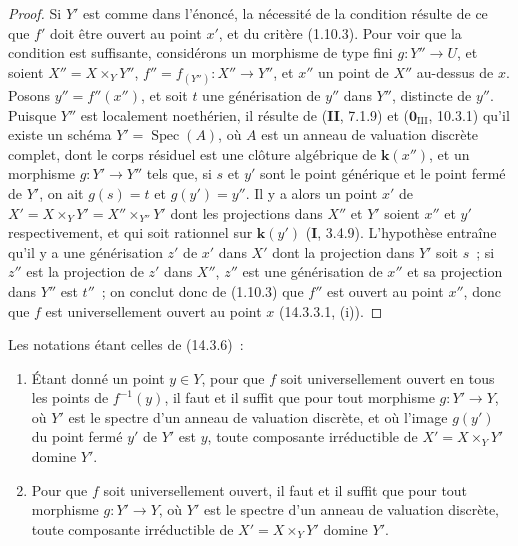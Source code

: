 \begin{proof}
Si $Y'$ est comme dans l'énoncé, la nécessité de la condition résulte de ce que
$f'$ doit être ouvert au point $x'$, et du critère (1.10.3). Pour voir que la
condition est suffisante, considérons un morphisme de type fini $g:Y''\to U$, et
soient $X''=X\times_Y Y''$, $f''=f_{(Y'')}:X''\to Y''$, et $x''$ un point de $X''$
au-dessus de $x$. Posons $y''=f''(x'')$, et soit $t$ une générisation de $y''$
dans $Y''$, distincte de $y''$. Puisque $Y''$ est localement noethérien, il
résulte de (\textbf{II}, 7.1.9) et ($\mathbf{0}_{\mathrm{III}}$, 10.3.1) qu'il
existe un schéma $Y'=\operatorname{Spec}(A)$, où $A$ est un anneau de valuation
discrète complet, dont le corps résiduel est une clôture algébrique de $\boldsymbol{k}(x'')$,
et un morphisme $g:Y'\to Y''$ tels que, si $s$ et $y'$ sont le point générique et
le point fermé de $Y'$, on ait $g(s)=t$ et $g(y')=y''$. Il y a alors un point $x'$
de $X'=X\times_Y Y'=X''\times_{Y''}Y'$ dont les projections dans $X''$ et $Y'$
soient $x''$ et $y'$ respectivement, et qui soit rationnel sur $\boldsymbol{k}(y')$ (\textbf{I}, 3.4.9).
L'hypothèse entraîne qu'il y a une générisation $z'$ de $x'$ dans $X'$ dont la
projection dans $Y'$ soit $s$~; si $z''$ est la projection de $z'$ dans $X''$,
$z''$ est une générisation de $x''$ et sa projection dans $Y''$ est $t''$~; on
conclut donc de (1.10.3) que $f''$ est ouvert au point $x''$, donc que $f$ est
universellement ouvert au point $x$ (14.3.3.1, (i)).
\end{proof}

\begin{corollary}[14.3.7]
\label{IV.14.3.7-fr}
Les notations étant celles de \textup{(14.3.6)}~:
\begin{enumerate}[label=\textup{(\roman*)}]
  \item Étant donné un point $y\in Y$, pour que $f$ soit universellement ouvert en
  tous les points de $f^{-1}(y)$, il faut et il suffit que pour tout morphisme
  $g:Y'\to Y$, où $Y'$ est le spectre d'un anneau de valuation discrète, et où
  l'image $g(y')$ du point fermé $y'$ de $Y'$ est $y$, toute composante
  irréductible de $X'=X\times_Y Y'$ domine $Y'$.
  \item Pour que $f$ soit universellement ouvert, il faut et il suffit que pour
  tout morphisme $g:Y'\to Y$, où $Y'$ est le spectre d'un anneau de valuation
  discrète, toute composante irréductible de $X'=X\times_Y Y'$ domine $Y'$.
\end{enumerate}
\end{corollary}

